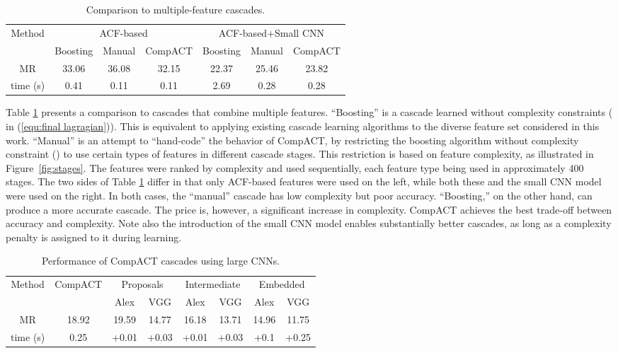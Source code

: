 \documentclass[10pt,twocolumn,letterpaper]{article}
\begin{document}
\begin{table}[t]
\centering \scriptsize \setlength{\tabcolsep}{3.0pt}
\caption{Comparison to multiple-feature cascades.}
\label{tab:cascade comparison multi}
\begin{tabular}
{|c||ccc|ccc|}\hline
\multirow{2}{*}{Method}
&\multicolumn{3}{|c|}{ACF-based}
&\multicolumn{3}{|c|}{ACF-based+Small CNN}\\
\cline{2-7}
& Boosting & Manual & CompACT & Boosting & Manual & CompACT \\\hline
MR     &33.06 &36.08 &32.15 &22.37 &25.46 &23.82\\
time (s) &0.41  &0.11  &0.11  &2.69  &0.28  &0.28\\\hline
\end{tabular}
\end{table}

Table \ref{tab:cascade comparison multi} presents a comparison to cascades
that combine multiple features. ``Boosting''  is a cascade learned without
complexity constraints ( in (\ref{equ:final lagragian})). This is equivalent to applying existing cascade learning
algorithms to the diverse feature set considered in this work.
``Manual'' is an attempt to ``hand-code'' the behavior of CompACT,
by restricting the boosting algorithm without complexity
constraint ()  to use certain types of features in different
cascade stages. This restriction is based on feature complexity, as
illustrated in Figure~\ref{fig:stages}. The features were ranked by complexity
and used sequentially, each feature type being used in approximately 400
stages. The two sides of Table \ref{tab:cascade comparison multi} differ in
that only ACF-based features were used on the left, while both these
and the small CNN model were used on the right.
In both cases, the ``manual'' cascade has low complexity but
poor accuracy. ``Boosting,'' on the other hand, can
produce a more accurate cascade. The price is, however, a significant
increase in complexity. CompACT achieves the best trade-off between
accuracy and complexity. Note also the introduction of the small CNN model enables substantially better
cascades, as long as a complexity penalty is assigned to it
during learning.

\begin{table}[t]
\centering \scriptsize \setlength{\tabcolsep}{3.0pt}
\caption{Performance of CompACT cascades using large CNNs.}
\label{tab:CNN comparison}
\begin{tabular}
{|c||c||cc|cc|cc|}\hline
\multirow{2}{*}{Method}
&\multirow{2}{*}{CompACT}
&\multicolumn{2}{|c|}{Proposals}
&\multicolumn{2}{|c|}{Intermediate}
&\multicolumn{2}{|c|}{Embedded}\\
\cline{3-8}
&\multicolumn{1}{|c||}{} & Alex & VGG & Alex & VGG & Alex & VGG \\\hline
MR       &18.92  &19.59   &14.77   &16.18   &13.71  &14.96  &11.75\\
time (s)   &0.25   &+0.01   &+0.03   &+0.01   &+0.03  &+0.1   &+0.25\\\hline
\end{tabular}
\end{table}
\end{document}
